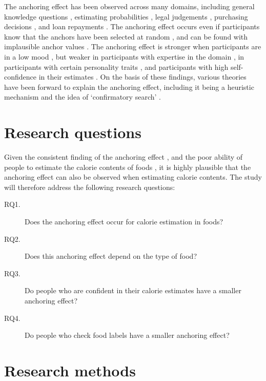 \documentclass[a4paper,doc,natbib]{apa6}
\begin{document}
    The anchoring effect has been observed across many domains, including general knowledge questions \citep[e.g.,][]{blankenship2008elaboration,epley2001putting},  estimating probabilities \citep{plous1989thinking}, legal judgements \citep{enough2001sentencing}, purchasing decisions \citep{ariely2003coherent}, and loan repayments \citep{stewart2009cost}. The anchoring effect occurs even if participants know that the anchors have been selected at random \citep{englich2006playing,tversky1974judgment}, and can be found with implausible anchor values \citep{strack1997explaining}. The anchoring effect is stronger when participants are in a low mood \citep{englich2009moody}, but weaker in participants with expertise in the domain \citep{wilson1996new,englich2009moody}, in participants with certain personality traits \citep{eroglu2010biases}, and participants with high self-confidence in their estimates \citep{wu2012role}. On the basis of these findings, various theories have been forward to explain the anchoring effect, including it being a heuristic mechanism \citep{tversky1974judgment} and the idea of `confirmatory search' \citep{chapman1999anchoring}.


    \section{Research questions}

    Given the consistent finding of the anchoring effect \citep{furnham2011literature}, and the poor ability of people to estimate the calorie contents of foods \citep[e.g.,][]{ebneter2013less}, it is highly plausible that the anchoring effect can also be observed when estimating calorie contents. The study will therefore address the following research questions:

    \begin{description}
        \item[RQ1.] Does the anchoring effect occur for calorie estimation in foods?
        \item[RQ2.] Does this anchoring effect depend on the type of food?
        \item[RQ3.] Do people who are confident in their calorie estimates have a smaller anchoring effect?
        \item[RQ4.] Do people who check food labels have a smaller anchoring effect?
    \end{description}


    \section{Research methods}
\end{document}
